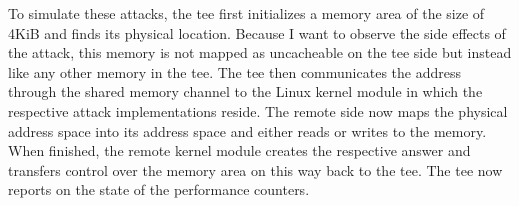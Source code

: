 To simulate these attacks, the \gls{tee} first initializes a memory area of the
size of 4KiB and finds its physical location. Because I want to observe the side
effects of the attack, this memory is not mapped as uncacheable on the \gls{tee}
side but instead like any other memory in the \gls{tee}. The \gls{tee} then
communicates the address through the shared memory channel to the Linux kernel
module in which the respective attack implementations reside. The remote side
now maps the physical address space into its address space and either reads or
writes to the memory. When finished, the remote kernel module creates the
respective answer and transfers control over the memory area on this way back to
the \gls{tee}. The \gls{tee} now reports on the state of the performance
counters.\\




